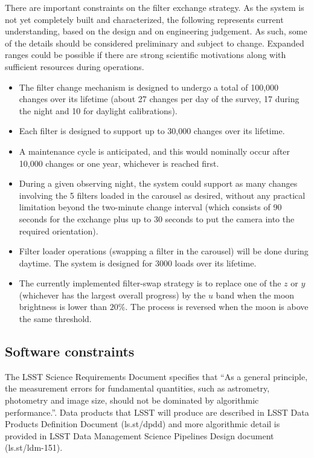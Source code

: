 \documentclass[DM,lsstdraft,toc,usenatbib]{lsstdoc}
\begin{document}
There are important constraints on the filter exchange strategy. As the system is not yet completely 
built and characterized, the following represents current understanding, based on the design and on 
engineering judgement. As such, some of the details should be considered preliminary and subject 
to change. Expanded ranges could be possible if there are strong scientific motivations along with
sufficient resources during operations.
\begin{itemize}
\item The filter change mechanism is designed to undergo a total of 100,000 changes over its lifetime 
	(about 27 changes per day of the survey, 17 during the night and 10 for daylight calibrations). 
\item Each filter is designed to support up to 30,000 changes over its lifetime.
\item A maintenance cycle is anticipated, and this would nominally occur after 10,000 changes or 
          one year, whichever is reached first. 
\item During a given observing night, the system could support as many changes involving the 5 filters 
          loaded in the carousel as desired, without any practical limitation beyond the two-minute change 
          interval (which consists of 90 seconds for the exchange plus up to 30 seconds to put the camera
          into the required orientation). 
\item Filter loader operations (swapping a filter in the carousel) will be done during daytime. The system 
          is designed for 3000 loads over its lifetime. 
\item The currently implemented filter-swap strategy is to replace one of the $z$ or $y$ (whichever has 
	the largest overall progress) by the $u$ band when the moon brightness is lower than $20\%$. The 
	process is reversed when the moon is above the same threshold. 	
\end{itemize} 


\subsection{Software constraints} 

The LSST Science Requirements Document specifies that ``As a general principle, the measurement errors
for fundamental quantities, such as astrometry, photometry and image size, should not be dominated by 
algorithmic performance.''. Data products that LSST will produce are described in LSST Data Products
Definition Document (ls.st/dpdd) and more algorithmic detail is provided in LSST Data Management 
Science Pipelines Design document (ls.st/ldm-151). 
\end{document}

